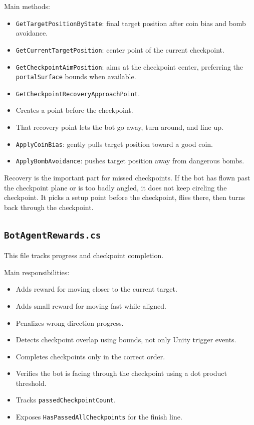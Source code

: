 \documentclass[11pt]{article}
\newcommand{\file}[1]{\texttt{#1}}
\newcommand{\code}[1]{{\footnotesize\texttt{#1}}}
\begin{document}
Main methods:

\begin{itemize}
    \item \code{GetTargetPositionByState}: final target position after coin bias and bomb avoidance.
    \item \code{GetCurrentTargetPosition}: center point of the current checkpoint.
    \item \code{GetCheckpointAimPosition}: aims at the checkpoint center, preferring the \code{portalSurface} bounds when available.
    \item \code{GetCheckpointRecoveryApproachPoint}.
    \item Creates a point before the checkpoint.
    \item That recovery point lets the bot go away, turn around, and line up.
    \item \code{ApplyCoinBias}: gently pulls target position toward a good coin.
    \item \code{ApplyBombAvoidance}: pushes target position away from dangerous bombs.
\end{itemize}

Recovery is the important part for missed checkpoints. If the bot has flown past the checkpoint plane or is too badly angled, it does not keep circling the checkpoint. It picks a setup point before the checkpoint, flies there, then turns back through the checkpoint.

\subsection{\file{BotAgentRewards.cs}}

This file tracks progress and checkpoint completion.

Main responsibilities:

\begin{itemize}
    \item Adds reward for moving closer to the current target.
    \item Adds small reward for moving fast while aligned.
    \item Penalizes wrong direction progress.
    \item Detects checkpoint overlap using bounds, not only Unity trigger events.
    \item Completes checkpoints only in the correct order.
    \item Verifies the bot is facing through the checkpoint using a dot product threshold.
    \item Tracks \code{passedCheckpointCount}.
    \item Exposes \code{HasPassedAllCheckpoints} for the finish line.
\end{itemize}
\end{document}
